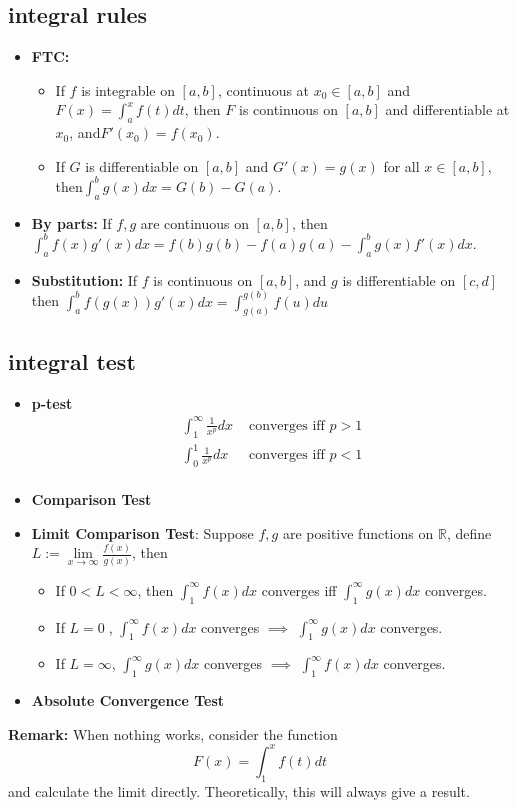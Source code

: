 \documentclass[a4paper,10pt]{article}
\newcommand{\R}{\mathbb{R}}
\begin{document}
\subsection{integral rules}
\begin{itemize}
    \item \textbf{FTC:}\begin{itemize}
        \item If $f$ is integrable on $[a,b]$, continuous at $x_0\in[a,b]$ and $F(x)=\int_a^x f(t)dt$, then $F$ is continuous on $[a,b]$ and differentiable at $x_0$, and\(
            F'(x_0) = f(x_0).
        \)
        \item If $G$ is differentiable on $[a,b]$ and $G'(x)=g(x)$ for all $x\in[a,b]$, then\(
            \int_a^b g(x)dx = G(b) - G(a).
        \)\end{itemize}
    \item \textbf{By parts:} If $f,g$ are continuous on $[a,b]$, then\(
        \int_a^b f(x)g'(x)dx = f(b)g(b) - f(a)g(a) - \int_a^b g(x)f'(x)dx.
    \)
    \item \textbf{Substitution:} If $f$ is continuous on $[a,b]$, and $g$ is differentiable on $[c,d]$ then \(
        \int_a^b f(g(x))g'(x)dx = \int_{g(a)}^{g(b)} f(u)du
    \)
    
\end{itemize}
\subsection{integral test}
\begin{itemize}
    \item \textbf{p-test}
    \begin{align*}
        \int_1^\infty \frac{1}{x^p} dx &\text{ converges iff } p>1\\
        \int_0^1 \frac{1}{x^p} dx &\text{ converges iff } p<1\\
    \end{align*}
    \item \textbf{Comparison Test}
    \item \textbf{Limit Comparison Test}: Suppose $f,g$ are positive functions on $\R$, define $L:=\lim\limits_{x\to\infty}\frac{f(x)}{g(x)}$, then\begin{itemize}
        \item If $0<L<\infty$, then $\int_1^\infty f(x)dx$ converges iff $\int_1^\infty g(x)dx$ converges.
        \item If $L=0\;$, $\int_1^\infty f(x)dx$ converges $\implies$ $\int_1^\infty g(x)dx$ converges.
        \item If $L=\infty$, $\int_1^\infty g(x)dx$ converges $\implies$ $\int_1^\infty f(x)dx$ converges.
    \end{itemize}
    \item \textbf{Absolute Convergence Test}
\end{itemize}
\textbf{Remark:} When nothing works, consider the function\[
    F(x) = \int_1^x f(t)dt
\]
and calculate the limit directly. Theoretically, this will always give a result.
\end{document}

